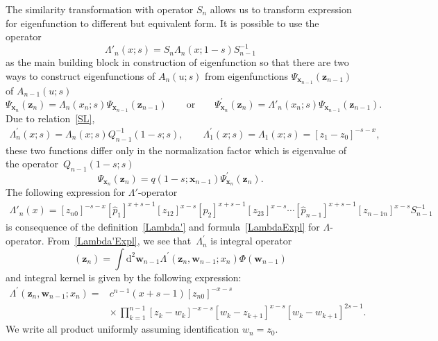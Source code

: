 \documentclass[10pt,a4paper]{amsart}
\numberwithin{equation}{section}
\begin{document}
The similarity transformation with operator $S_n$ allows us to
transform expression for eigenfunction to different but equivalent form.
It is possible to use the operator
\begin{equation} \label{Lambda'}
\Lambda'_n(x;s) = S_n \Lambda_n(x;1-s) S_{n-1}^{-1}
\end{equation}
as the main building block in construction of eigenfunction so that
there are two ways to construct eigenfunctions of $A_{n}(u;s)$ from eigenfunctions $\Psi_{\bm {x}_{n-1}}(\bm z_{n-1})$ of $A_{n-1}(u;s)$
\begin{equation} \label{PsiPsi'}
\Psi_{\bm {x}_{n}}(\bm z_{n}) = \Lambda_n(x_n;s)
\Psi_{\bm {x}_{n-1}}(\bm z_{n-1})
	\qquad \text{or} \qquad
\Psi^{\prime}_{\bm {x}_{n}}(\bm z_{n}) = \Lambda'_n(x_n;s)
\Psi_{\bm {x}_{n-1}}(\bm z_{n-1}) .
\end{equation}
Due to relation~\eqref{SL},
\begin{align*}
\Lambda^{\prime}_n(x;s) =
\Lambda_n(x;s) Q^{-1}_{n-1}(1-s;s), \qquad
\Lambda^{\prime}_1(x;s) =
\Lambda_1(x;s) = [z_1-z_0]^{-s-x} ,
\end{align*}
these two functions differ only in the normalization factor
which is eigenvalue of the operator~$Q_{n-1}(1-s;s)$
\begin{equation*}
\Psi_{\bm {x}_{n}}(\bm z_{n})
= q(1-s;\bm x_{n-1}) \Psi^{\prime}_{\bm {x}_{n}}(\bm z_{n}) .
\end{equation*}
The following expression for $\Lambda'$-operator
\begin{align} \label{Lambda'Expl}
	\Lambda'_n( x)
	= [z_{n0}]^{-s-x}
	[\hat{p}_1]^{x+s-1} [z_{12}]^{x-s}
	[\hat{p}_2]^{x+s-1} [z_{23}]^{x-s}\cdots
	[\hat{p}_{n-1}]^{x+s-1} [z_{n-1 n}]^{x-s}
	S_{n-1}^{-1}
\end{align}
is consequence of the definition~\eqref{Lambda'} and
formula~\eqref{LambdaExpl} for $\Lambda$-operator.
From~\eqref{Lambda'Expl}, we see that~$\Lambda^{\prime}_n$ is integral operator
\begin{equation*}
[\Lambda^{\prime}_n(x) \Phi](\bm z_n) =
\int \mathrm{d}^{2} \bm w_{n-1}
\Lambda^{\prime}(\bm z_n,\bm w_{n-1};x_n)
\Phi(\bm w_{n-1})
\end{equation*}
and integral kernel is given by the following expression:
\begin{align*}
\Lambda^{\prime}(\bm z_n,\bm w_{n-1}; x_n) ={}& c^{n-1}(x+s-1) [z_{n 0}]^{-x-s} \\
& {\times}\,
\prod\limits_{k=1}^{n-1} [z_k-w_k]^{-x-s} [w_k-z_{k+1}]^{x-s}
[w_k-w_{k+1}]^{2s-1} .
\end{align*}
We write all product uniformly assuming identification $w_{n} = z_0$.
\end{document}
